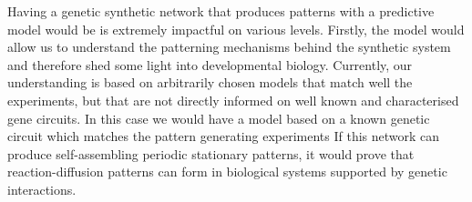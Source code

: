 Having a genetic synthetic network that produces patterns with a predictive model would be is extremely impactful on various levels.
Firstly, the model would allow us to understand the patterning mechanisms behind the synthetic system and therefore shed some light into developmental biology.
Currently, our understanding is based on arbitrarily chosen models that match well the experiments, but that are not directly informed on well known and characterised gene circuits.
In this case we would have a model based on a known genetic circuit which matches the pattern generating experiments %
If this network can produce self-assembling periodic stationary patterns, it would prove that reaction-diffusion patterns can form in biological systems supported by genetic interactions.








